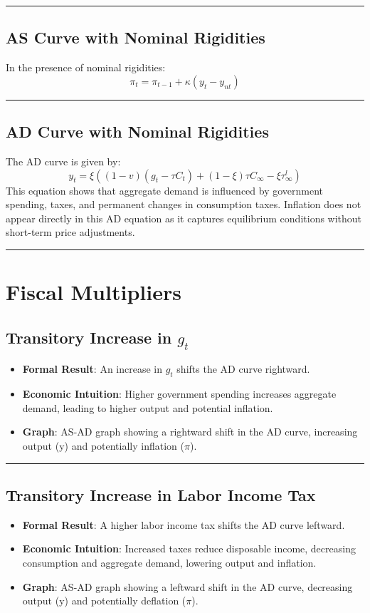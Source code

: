 \documentclass{article}
\begin{document}
\noindent\rule{\linewidth}{0.5pt}

\subsection{AS Curve with Nominal Rigidities}
In the presence of nominal rigidities:
\[
\pi_t = \pi_{t-1} + \kappa (y_t - y_{nt})
\]

\noindent\rule{\linewidth}{0.5pt}

\subsection{AD Curve with Nominal Rigidities}
The AD curve is given by:
\[
y_t = \xi \left( (1 - v) (g_t - \tau C_t) + (1 - \xi)\tau C_\infty - \xi\tau^l_\infty \right)
\]
This equation shows that aggregate demand is influenced by government spending, taxes, and permanent changes in consumption taxes. Inflation does not appear directly in this AD equation as it captures equilibrium conditions without short-term price adjustments.

\noindent\rule{\linewidth}{1pt}

\FloatBarrier{}

\section{Fiscal Multipliers}

\subsection{Transitory Increase in \( g_t \)}
\begin{itemize}
    \item \textbf{Formal Result}: An increase in \( g_t \) shifts the AD curve rightward.
    \item \textbf{Economic Intuition}: Higher government spending increases aggregate demand, leading to higher output and potential inflation.
    \item \textbf{Graph}: AS-AD graph showing a rightward shift in the AD curve, increasing output (y) and potentially inflation (\(\pi \)).
\end{itemize}

\noindent\rule{\linewidth}{0.5pt}

\subsection{Transitory Increase in Labor Income Tax}
\begin{itemize}
    \item \textbf{Formal Result}: A higher labor income tax shifts the AD curve leftward.
    \item \textbf{Economic Intuition}: Increased taxes reduce disposable income, decreasing consumption and aggregate demand, lowering output and inflation.
    \item \textbf{Graph}: AS-AD graph showing a leftward shift in the AD curve, decreasing output (y) and potentially deflation (\(\pi \)).
\end{itemize}
\end{document}
